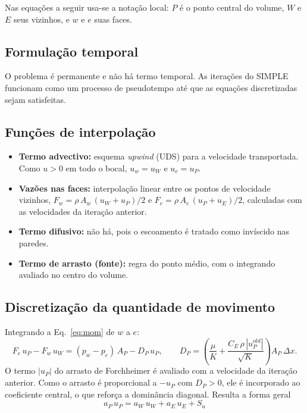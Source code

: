 \documentclass[11pt,a4paper]{article}
\begin{document}
Nas equações a seguir usa-se a notação local: $P$ é o ponto central do
volume, $W$ e $E$ seus vizinhos, e $w$ e $e$ suas faces.

\subsection{Formulação temporal}

O problema é permanente e não há termo temporal. As iterações do SIMPLE
funcionam como um processo de pseudotempo até que as equações discretizadas
sejam satisfeitas.

\subsection{Funções de interpolação}

\begin{itemize}
  \item \textbf{Termo advectivo:} esquema \emph{upwind} (UDS) para a
        velocidade transportada. Como $u>0$ em todo o bocal,
        $u_w=u_W$ e $u_e=u_P$.
  \item \textbf{Vazões nas faces:} interpolação linear entre os pontos de
        velocidade vizinhos,
        $F_w=\rho\,A_w\,(u_W+u_P)/2$ e $F_e=\rho\,A_e\,(u_P+u_E)/2$,
        calculadas com as velocidades da iteração anterior.
  \item \textbf{Termo difusivo:} não há, pois o escoamento é tratado como
        invíscido nas paredes.
  \item \textbf{Termo de arrasto (fonte):} regra do ponto médio, com o
        integrando avaliado no centro do volume.
\end{itemize}

\subsection{Discretização da quantidade de movimento}

Integrando a Eq.~\eqref{eq:mom} de $w$ a $e$:
\begin{equation}
  F_e\,u_P-F_w\,u_W=(p_w-p_e)\,A_P-D_P\,u_P ,
  \qquad
  D_P=\left(\frac{\mu}{K}+\frac{C_E\,\rho\,|u_P^{old}|}{\sqrt{K}}\right)A_P\,\Delta x .
\end{equation}
O termo $|u_P|$ do arrasto de Forchheimer é avaliado com a velocidade da
iteração anterior. Como o arrasto é proporcional a $-u_P$ com $D_P>0$, ele é
incorporado ao coeficiente central, o que reforça a dominância diagonal.
Resulta a forma geral
\begin{equation}
  \boxed{\;a_P\,u_P=a_W\,u_W+a_E\,u_E+S_u\;}
\end{equation}
\end{document}
